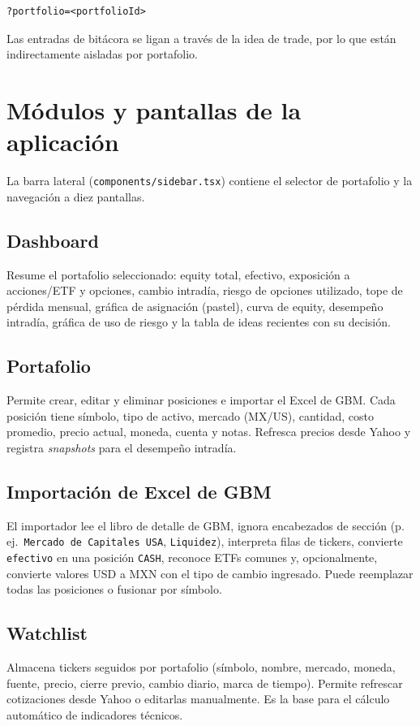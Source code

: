 \documentclass[11pt,letterpaper]{article}
\begin{document}
\begin{lstlisting}
?portfolio=<portfolioId>
\end{lstlisting}

Las entradas de bitácora se ligan a través de la idea de trade, por lo que están
indirectamente aisladas por portafolio.

\section{Módulos y pantallas de la aplicación}

La barra lateral (\texttt{components/sidebar.tsx}) contiene el selector de
portafolio y la navegación a diez pantallas.

\subsection{Dashboard}
Resume el portafolio seleccionado: equity total, efectivo, exposición a
acciones/ETF y opciones, cambio intradía, riesgo de opciones utilizado, tope de
pérdida mensual, gráfica de asignación (pastel), curva de equity, desempeño
intradía, gráfica de uso de riesgo y la tabla de ideas recientes con su decisión.

\subsection{Portafolio}
Permite crear, editar y eliminar posiciones e importar el Excel de GBM. Cada
posición tiene símbolo, tipo de activo, mercado (MX/US), cantidad, costo
promedio, precio actual, moneda, cuenta y notas. Refresca precios desde Yahoo y
registra \emph{snapshots} para el desempeño intradía.

\subsection{Importación de Excel de GBM}
El importador lee el libro de detalle de GBM, ignora encabezados de sección
(p.\,ej.\ \texttt{Mercado de Capitales USA}, \texttt{Liquidez}), interpreta filas
de tickers, convierte \texttt{efectivo} en una posición \texttt{CASH}, reconoce
ETFs comunes y, opcionalmente, convierte valores USD a MXN con el tipo de cambio
ingresado. Puede reemplazar todas las posiciones o fusionar por símbolo.

\subsection{Watchlist}
Almacena tickers seguidos por portafolio (símbolo, nombre, mercado, moneda,
fuente, precio, cierre previo, cambio diario, marca de tiempo). Permite refrescar
cotizaciones desde Yahoo o editarlas manualmente. Es la base para el cálculo
automático de indicadores técnicos.
\end{document}
